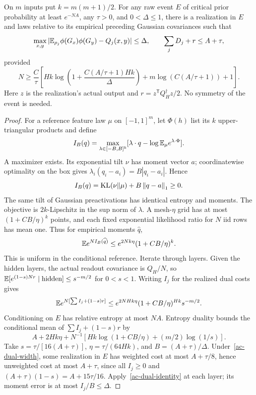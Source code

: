 \begin{lemma}\label{ac-dual}
On $m$ inputs put $k=m(m+1)/2$. For any raw event $E$ of critical
prior probability at least $e^{-NA}$, any $\tau>0$, and
$0<\Delta\le1$, there is a realization in $E$ and laws relative
to its empirical preceding Gaussian covariances such that
\[
 \max_{x,y}|\mathbb E_{\rho_j}\phi(G_x)\phi(G_y)-Q_j(x,y)|\le\Delta,
 \qquad \sum_jD_j+r\le A+\tau,
\]
provided
\begin{equation}\label{ac-dual-width}
 N\ge\frac C\tau\left[
 Hk\log\left(1+\frac{C(A/\tau+1)Hk}{\Delta}\right)
 +m\log(C(A/\tau+1))+1\right].
\end{equation}
Here $z$ is the realization's actual output and
$r=z^{\mathsf T}Q_H^\dagger z/2$. No symmetry of the event is needed.
\end{lemma}
\begin{proof}
For a reference feature law $\mu$ on $[-1,1]^m$, let $\Phi(h)$ list
its $k$ upper-triangular products and define
\[
 I_B(q)=\max_{\lambda\in[-B,B]^k}
       [\lambda\cdot q-\log\mathbb E_\mu e^{\lambda\cdot\Phi}].
\]
A maximizer exists. Its exponential tilt $\nu$ has moment vector
$a$; coordinatewise optimality on the box gives
$\lambda_i(q_i-a_i)=B|q_i-a_i|$. Hence
\begin{equation}\label{ac-dual-identity}
 I_B(q)=\operatorname{KL}(\nu\Vert\mu)+B\left\lVert q-a\right\rVert_1\ge0.
\end{equation}
The same tilt of Gaussian preactivations has identical entropy and
moments. The objective is $2k$-Lipschitz in the sup norm of $\lambda$.
A mesh-$\eta$ grid has at most $(1+CB/\eta)^k$ points, and each
fixed exponential likelihood ratio for $N$ iid rows has mean one.
Thus for empirical moments $\widehat q$,
\[
 \mathbb E e^{N I_B(\widehat q)}\le e^{2Nk\eta}(1+CB/\eta)^k.
\]
This is uniform in the conditional reference. Iterate through layers.
Given the hidden layers, the actual readout covariance is $Q_H/N$,
so $\mathbb E[e^{(1-s)Nr}\mid\text{hidden}]\le s^{-m/2}$ for $0<s<1$.
Writing $I_j$ for the realized dual costs gives
\[
 \mathbb E e^{N[\sum I_j+(1-s)r]}
 \le e^{2NHk\eta}(1+CB/\eta)^{Hk}s^{-m/2}.
\]
Conditioning on $E$ has relative entropy at most $NA$. Entropy
duality bounds the conditional mean of $\sum I_j+(1-s)r$ by
\[
 A+2Hk\eta+N^{-1}[Hk\log(1+CB/\eta)+(m/2)\log(1/s)].
\]
Take $s=\tau/[16(A+\tau)]$, $\eta=\tau/(64Hk)$, and
$B=(A+\tau)/\Delta$. Under~\eqref{ac-dual-width}, some realization
in $E$ has weighted cost at most $A+\tau/8$, hence unweighted cost
at most $A+\tau$, since all $I_j\ge0$ and
$(A+\tau)(1-s)=A+15\tau/16$. Apply~\eqref{ac-dual-identity}
at each layer; its moment error is at most $I_j/B\le\Delta$.
\end{proof}

